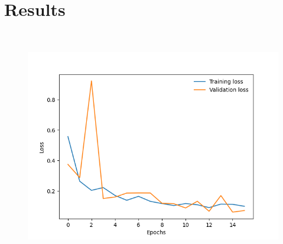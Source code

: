 \section{Results}
\
\begin{figure}[!h]
    \centering
    \includegraphics[width=\columnwidth,keepaspectratio]
    {./figures/mobile_model_apple_trees_16its_2022-11-15_training_curve}
    \caption{
    }
    \label{fig:apple-tree-mode-training-curve}
\end{figure}
